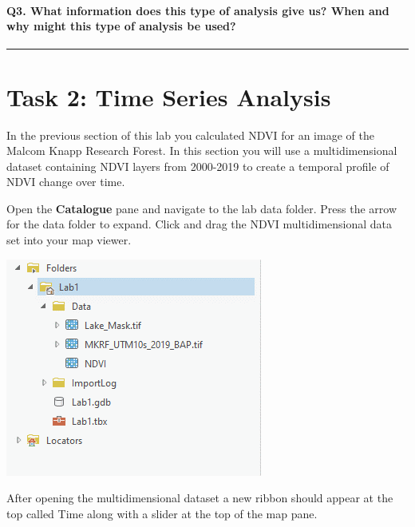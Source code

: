\documentclass[
]{book}
\begin{document}
\hypertarget{q3.-what-information-does-this-type-of-analysis-give-us-when-and-why-might-this-type-of-analysis-be-used}{%
\paragraph*{Q3. What information does this type of analysis give us? When and why might this type of analysis be used?}\label{q3.-what-information-does-this-type-of-analysis-give-us-when-and-why-might-this-type-of-analysis-be-used}}

\begin{center}\rule{0.5\linewidth}{0.5pt}\end{center}

\hypertarget{task-2-time-series-analysis}{%
\section*{Task 2: Time Series Analysis}\label{task-2-time-series-analysis}}

In the previous section of this lab you calculated NDVI for an image of the Malcom Knapp Research Forest. In this section you will use a multidimensional dataset containing NDVI layers from 2000-2019 to create a temporal profile of NDVI change over time.

Open the \textbf{Catalogue} pane and navigate to the lab data folder. Press the arrow for the data folder to expand. Click and drag the NDVI multidimensional data set into your map viewer.

\begin{center}\includegraphics[width=0.4\linewidth]{images/07-ndvi-layer} \end{center}

After opening the multidimensional dataset a new ribbon should appear at the top called Time along with a slider at the top of the map pane.
\end{document}

